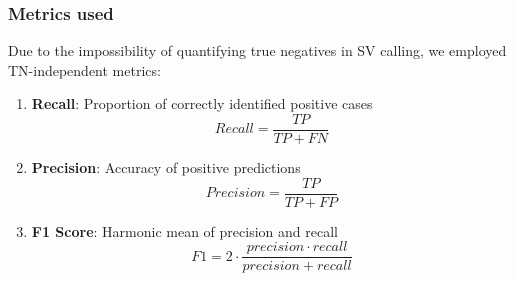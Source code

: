 





\subsubsection{Metrics used}

Due to the impossibility of quantifying true negatives in SV calling, we 
employed TN-independent metrics:

\begin{enumerate}[leftmargin=\parindent]
    
    \item \textbf{Recall}: Proportion of correctly identified positive cases
    \begin{equation}
        \label{eq:recall}
        Recall = \frac{TP}{TP + FN}
    \end{equation}

    \item \textbf{Precision}: Accuracy of positive predictions
    \begin{equation}
        \label{eq:precision}
        Precision = \frac{TP}{TP + FP}
    \end{equation}

    \item \textbf{F1 Score}: Harmonic mean of precision and recall
    \begin{equation}
        \label{eq:f1score}
        F1 = 2 \cdot \frac{precision \cdot recall}{precision + recall}
    \end{equation}

\end{enumerate}


